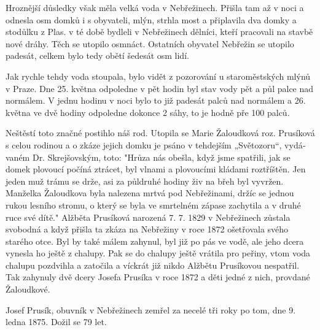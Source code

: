 \documentclass[../dejiny-rodu-prusiku.tex]{subfiles}
\begin{document}
Hroznější důsledky však měla velká voda v Nebřežinech. Přišla tam až v noci a odnesla osm domků i s obyvateli, mlýn, strhla most a připlavila dva domky a stodůlku z Plas. v té době bydleli v Nebřežinech dělníci, kteří pra­covali na stavbě nové dráhy. Těch se utopilo osmnáct. Ostatních obyvatel Nebřežin se utopilo padesát, celkem bylo tedy obětí šedesát osm lidí.

Jak rychle tehdy voda stoupala, bylo vidět z pozorování u staroměstských mlýnů v Praze. Dne 25. května odpoledne v pět hodin byl stav vody pět a půl palce nad normálem. V jednu hodinu v noci bylo to již pa­desát palců nad normálem a 26. května ve dvě hodiny odpoledne dokonce 2 sáhy, to je hodně pře 100 pal­ců.

Neštěstí toto značné postihlo náš rod. Utopila se Ma­rie Žaloudková roz. Prusíková s celou rodinou a o zká­ze jejich domku je psáno v tehdejším „Světozoru“, vydá­vaném Dr. Skrejšovským, toto: "Hrůza nás obešla, když jsme spatřili, jak se domek plovoucí počíná ztrácet, byl vlnami a plovoucími kládami roztříštěn. Jen jeden muž trámu se drže, asi za půldruhé hodiny živ na břeh byl vyvržen. Manželka Žaloudkova byla nalezena mrtvá pod Nebřežinami, držíc se jednou rukou lesního stromu, o který se byla ve smrtelném zápase zachytila a v druhé ruce své dítě." Alžběta Prusíková narozená 7. 7. 1829 v Nebřežinech zůstala svobodná a když přišla ta zkáza na Nebřežiny v roce 1872 ošetřovala svého starého otce. Byl by také málem zahynul, byl již po pás ve vodě, ale jeho dce­ra vynesla ho ještě z chalupy. Pak se do chalupy ještě vrátila pro peřiny, vtom voda chalupu pozdvihla a za­točila a víckrát již nikdo Alžbětu Prusíkovou nespatřil. Tak zahynuly dvě dcery Josefa Prusíka v roce 1872 a děti jedné z nich, provdané Žaloudkové.

Josef Prusík, obuvník v Nebřežinech zemřel za necelé tři roky po tom, dne 9. ledna 1875. Dožil se 79 let.
\end{document}
